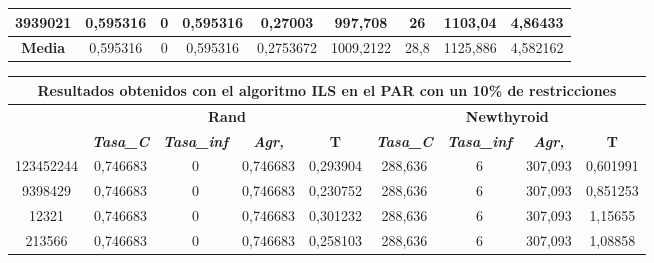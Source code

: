 \documentclass[12pt, spanish]{article}
\begin{document}
\begin{table}[H]
\begin{tabular}{|c|c|c|c|c|c|c|c|c|}
3939021           & 0,595316                  & 0                           & 0,595316               & 0,27003    & 997,708                   & 26                          & 1103,04                & 4,86433    \\ \hline
\textbf{Media}    & 0,595316                  & 0                           & 0,595316               & 0,2753672  & 1009,2122                 & 28,8                        & 1125,886               & 4,582162   \\ \hline
\end{tabular}
\end{table}

\begin{table}[H]
\begin{tabular}{|c|c|c|c|c|c|c|c|c|}
\hline
\multicolumn{9}{|c|}{\textbf{Resultados obtenidos con el algoritmo ILS en el PAR con un 10\% de restricciones}}                                                                                                   \\ \hline
\multirow{2}{*}{} & \multicolumn{4}{c|}{\textbf{Rand}}                                                            & \multicolumn{4}{c|}{\textbf{Newthyroid}}                                                      \\ \cline{2-9} 
                  & \textit{\textbf{Tasa\_C}} & \textit{\textbf{Tasa\_inf}} & \textit{\textbf{Agr,}} & \textbf{T} & \textit{\textbf{Tasa\_C}} & \textit{\textbf{Tasa\_inf}} & \textit{\textbf{Agr,}} & \textbf{T} \\ \hline
123452244         & 0,746683                  & 0                           & 0,746683               & 0,293904   & 288,636                   & 6                           & 307,093                & 0,601991   \\ \hline
9398429           & 0,746683                  & 0                           & 0,746683               & 0,230752   & 288,636                   & 6                           & 307,093                & 0,851253   \\ \hline
12321             & 0,746683                  & 0                           & 0,746683               & 0,301232   & 288,636                   & 6                           & 307,093                & 1,15655    \\ \hline
213566            & 0,746683                  & 0                           & 0,746683               & 0,258103   & 288,636                   & 6                           & 307,093                & 1,08858    \\ \hline

\end{tabular}
\end{table}
\end{document}
